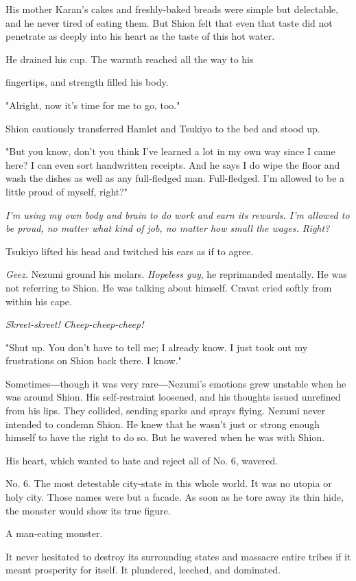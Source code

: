 His mother Karan's cakes and freshly-baked breads were simple but
delectable, and he never tired of eating them. But Shion felt that even
that taste did not penetrate as deeply into his heart as the taste of
this hot water.~

He drained his cup. The warmth reached all the way to his~

fingertips, and strength filled his body.

"Alright, now it's time for me to go, too."

Shion cautiously transferred Hamlet and Tsukiyo to the bed and stood up.

"But you know, don't you think I've learned a lot in my own way since I
came here? I can even sort handwritten receipts. And he says I do wipe
the floor and wash the dishes as well as any full-fledged man.
Full-fledged. I'm allowed to be a little proud of myself, right?"

\emph{I'm using my own body and brain to do work and earn its rewards. I'm
allowed to be proud, no matter what kind of job, no matter how small the
wages. Right?}

Tsukiyo lifted his head and twitched his ears as if to agree.

\emph{Geez.} Nezumi ground his molars. \emph{Hopeless guy}, he reprimanded mentally.
He was not referring to Shion. He was talking about himself. Cravat
cried softly from within his cape.

\emph{Skreet-skreet! Cheep-cheep-cheep!}

"Shut up. You don't have to tell me; I already know. I just took out my
frustrations on Shion back there. I know."

Sometimes―though it was very rare―Nezumi's emotions grew unstable when
he was around Shion. His self-restraint loosened, and his thoughts
issued unrefined from his lips. They collided, sending sparks and sprays
flying. Nezumi never intended to condemn Shion. He knew that he wasn't
just or strong enough himself to have the right to do so. But he wavered
when he was with Shion.

His heart, which wanted to hate and reject all of No. 6, wavered.

No. 6. The most detestable city-state in this whole world. It was no
utopia or holy city. Those names were but a facade. As soon as he tore
away its thin hide, the monster would show its true figure.

A man-eating monster.

It never hesitated to destroy its surrounding states and massacre entire
tribes if it meant prosperity for itself. It plundered, leeched, and
dominated.

